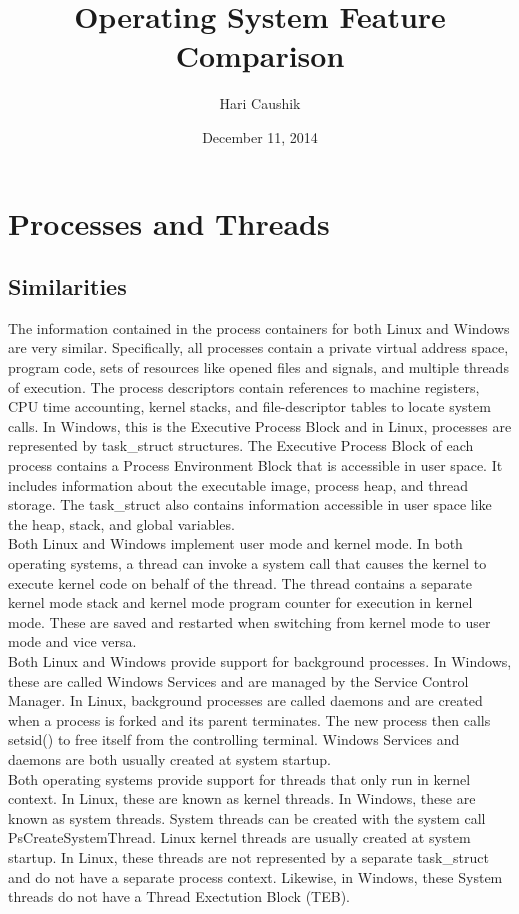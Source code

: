 \documentclass[letterpaper,10pt,titlepage]{article}
\title{Operating System Feature Comparison}
\date{December 11, 2014}
\author{Hari Caushik}
\begin{document}
\maketitle
\thispagestyle{empty}
\newpage

\tableofcontents
\newpage

\section{Processes and Threads}
\subsection{Similarities}
The information contained in the process containers for both Linux and Windows
are very similar. Specifically, all processes contain a private virtual 
address space, program code, sets of resources like opened files and signals,
and multiple threads of execution. The process descriptors contain references
to machine registers, CPU time accounting, kernel stacks, and file-descriptor
tables to locate system calls. In Windows, this is the Executive Process Block
and in Linux, processes are represented by task\_struct structures. The 
Executive Process Block of each process contains a Process Environment Block 
that is accessible in user space. It includes information about the executable
image, process heap, and thread storage. The task\_struct also contains 
information accessible in user space like the heap, stack, and global
variables.
\\
\linebreak
Both Linux and Windows implement user mode and kernel mode. In both operating
systems, a thread can invoke a system call that causes the kernel to execute
kernel code on behalf of the thread. The thread contains a separate kernel 
mode stack and kernel mode program counter for execution in kernel mode. These
are saved and restarted when switching from kernel mode to user mode and vice
versa.
\\
\linebreak
Both Linux and Windows provide support for background processes. In Windows,
these are called Windows Services and are managed by the Service Control 
Manager. In Linux, background processes are called daemons and are created 
when a process is forked and its parent terminates. The new process then calls
setsid() to free itself from the controlling terminal. Windows Services and 
daemons are both usually created at system startup.
\\
\linebreak
Both operating systems provide support for threads that only run in kernel 
context. In Linux, these are known as kernel threads. In Windows, these are 
known as system threads. System threads can be created with the system call
PsCreateSystemThread. Linux kernel threads are usually created at system 
startup. In Linux, these threads are not represented by a separate task\_struct
and do not have a separate process context. Likewise, in Windows, these
System threads do not have a Thread Exectution Block (TEB).
\end{document}
